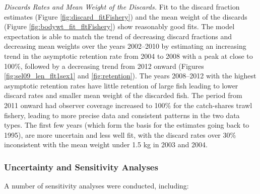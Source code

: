 \documentclass[12pt,]{article}
\begin{document}
\emph{Discards Rates and Mean Weight of the Discards.} Fit to the
discard fraction estimates (Figure \ref{fig:discard_fitFishery}) and the
mean weight of the discards (Figure \ref{fig:bodywt_fit_fltFishery})
show reasonably good fits. The model expectation is able to match the
trend of decreasing discard fractions and decreasing mean weights over
the years 2002--2010 by estimating an increasing trend in the asymptotic
retention rate from 2004 to 2008 with a peak at close to 100\%, followed
by a decreasing trend from 2012 onward (Figures
\ref{fig:sel09_len_flt1sex1} and \ref{fig:retention}). The years
2008--2012 with the highest asymptotic retention rates have little
retention of large fish leading to lower discard rates and smaller mean
weight of the discarded fish. The period from 2011 onward had observer
coverage increased to 100\% for the catch-shares trawl fishery, leading
to more precise data and consistent patterns in the two data types. The
first few years (which form the basis for the estimates going back to
1995), are more uncertain and less well fit, with the discard rates over
30\% inconsistent with the mean weight under 1.5 kg in 2003 and 2004.

\hypertarget{uncertainty-and-sensitivity-analyses}{%
\subsubsection{Uncertainty and Sensitivity
Analyses}\label{uncertainty-and-sensitivity-analyses}}

A number of sensitivity analyses were conducted, including:
\end{document}
